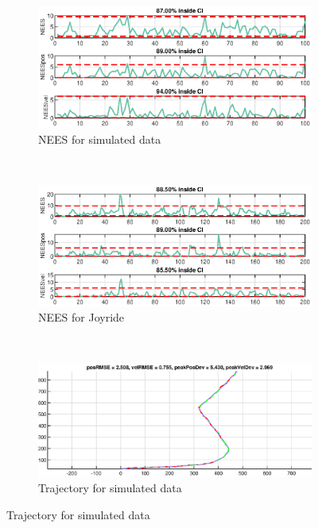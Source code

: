 \begin{figure}[ht]
	\begin{subfigure}[h]{0.4\textwidth}
		\includegraphics[width=\textwidth]{figures/ga_1/2_NEES}
		\caption{NEES for simulated data}
		\label{fig:ga_1_2_NEES}
    \end{subfigure}%
    ~
	\begin{subfigure}[h]{0.4\textwidth}
		\includegraphics[width=\textwidth]{figures/ga_1/joyride_NEES}
		\caption{NEES for Joyride}
		\label{fig:ga_1_joyride_NEES}
	\end{subfigure}
        \\
    \begin{subfigure}[h]{0.4\textwidth}
        \includegraphics[width=\textwidth]{figures/ga_1/2_estimated_trajectory}
        \caption{Trajectory for simulated data}
        \label{fig:ga_1_2_estimated_trajectory}

\end{subfigure}
\end{figure}
